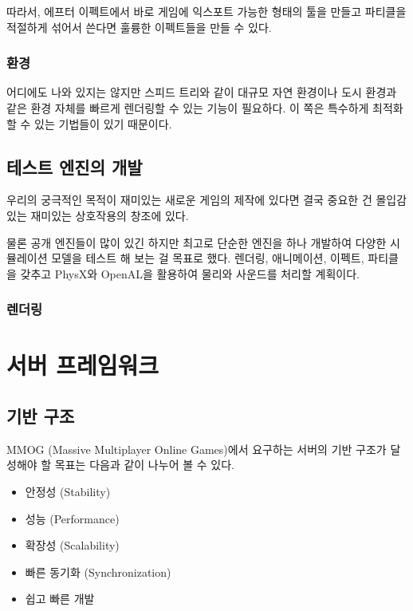 \documentclass[chapter,kosection, 10.5pt, romanfixed, a4paper]{oblivoir}
\begin{document}
따라서, 에프터 이펙트에서 바로 게임에 익스포트 가능한 형태의 툴을 만들고 
파티클을 적절하게 섞어서 쓴다면 훌륭한 이펙트들을 만들 수 있다. 

\subsection{환경}

어디에도 나와 있지는 않지만 스피드 트리와 같이 대규모 자연 환경이나 
도시 환경과 같은 환경 자체를 빠르게 렌더링할 수 있는 기능이 필요하다. 
이 쪽은 특수하게 최적화 할 수 있는 기법들이 있기 때문이다. 


\section{테스트 엔진의 개발}

우리의 궁극적인 목적이 재미있는 새로운 게임의 제작에 있다면 결국 중요한 건 
몰입감 있는 재미있는 상호작용의 창조에 있다. 

물론 공개 엔진들이 많이 있긴 하지만 최고로 단순한 엔진을 하나 개발하여 다양한
시뮬레이션 모델을 테스트 해 보는 걸 목표로 했다. 렌더링, 애니메이션, 이펙트, 
파티클을 갖추고 PhysX와 OpenAL을 활용하여 물리와 사운드를 처리할 계획이다. 

\subsection{렌더링}

 
\chapter{서버 프레임워크}

\section{기반 구조}

MMOG (Massive Multiplayer Online Games)에서 요구하는 서버의 기반 구조가 
달성해야 할 목표는 다음과 같이 나누어 볼 수 있다. 

\begin{itemize}
\item 안정성 (Stability)
\item 성능 (Performance)
\item 확장성 (Scalability)
\item 빠른 동기화 (Synchronization)
\item 쉽고 빠른 개발
\end{itemize}
\end{document}
